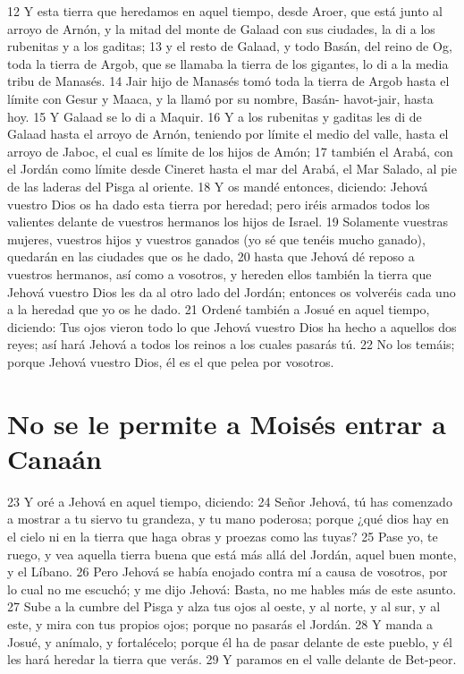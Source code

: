 12 Y esta tierra que heredamos en aquel tiempo, desde Aroer, que está junto al arroyo de Arnón, y la mitad del monte de Galaad con sus ciudades, la di a los rubenitas y a los gaditas;
13 y el resto de Galaad, y todo Basán, del reino de Og, toda la tierra de Argob, que se llamaba la tierra de los gigantes, lo di a la media tribu de Manasés.
14 Jair hijo de Manasés tomó toda la tierra de Argob hasta el límite con Gesur y Maaca, y la llamó por su nombre, Basán- havot-jair, hasta hoy.
15 Y Galaad se lo di a Maquir.
16 Y a los rubenitas y gaditas les di de Galaad hasta el arroyo de Arnón, teniendo por límite el medio del valle, hasta el arroyo de Jaboc, el cual es límite de los hijos de Amón;
17 también el Arabá, con el Jordán como límite desde Cineret hasta el mar del Arabá, el Mar Salado, al pie de las laderas del Pisga al oriente.
18 Y os mandé entonces, diciendo: Jehová vuestro Dios os ha dado esta tierra por heredad; pero iréis armados todos los valientes delante de vuestros hermanos los hijos de Israel.
19 Solamente vuestras mujeres, vuestros hijos y vuestros ganados (yo sé que tenéis mucho ganado), quedarán en las ciudades que os he dado,
20 hasta que Jehová dé reposo a vuestros hermanos, así como a vosotros, y hereden ellos también la tierra que Jehová vuestro Dios les da al otro lado del Jordán; entonces os volveréis cada uno a la heredad que yo os he dado.
21 Ordené también a Josué en aquel tiempo, diciendo: Tus ojos vieron todo lo que Jehová vuestro Dios ha hecho a aquellos dos reyes; así hará Jehová a todos los reinos a los cuales pasarás tú.
22 No los temáis; porque Jehová vuestro Dios, él es el que pelea por vosotros.

\section{No se le permite a Moisés entrar a Canaán}

23 Y oré a Jehová en aquel tiempo, diciendo:
24 Señor Jehová, tú has comenzado a mostrar a tu siervo tu grandeza, y tu mano poderosa; porque ¿qué dios hay en el cielo ni en la tierra que haga obras y proezas como las tuyas?
25 Pase yo, te ruego, y vea aquella tierra buena que está más allá del Jordán, aquel buen monte, y el Líbano.
26 Pero Jehová se había enojado contra mí a causa de vosotros, por lo cual no me escuchó; y me dijo Jehová: Basta, no me hables más de este asunto.
27 Sube a la cumbre del Pisga y alza tus ojos al oeste, y al norte, y al sur, y al este, y mira con tus propios ojos; porque no pasarás el Jordán.
28 Y manda a Josué, y anímalo, y fortalécelo; porque él ha de pasar delante de este pueblo, y él les hará heredar la tierra que verás.
29 Y paramos en el valle delante de Bet-peor.

